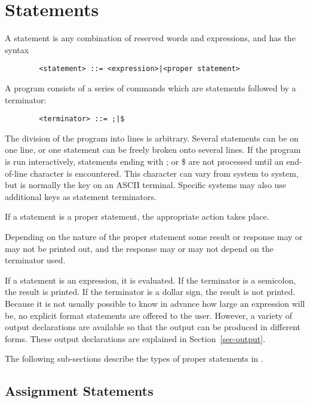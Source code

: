 \chapter{Statements}

A statement is any combination of reserved words and
expressions, and has the syntax 
\begin{verbatim}
        <statement> ::= <expression>|<proper statement>
\end{verbatim}
A {\REDUCE} program consists of a series of commands which are statements
followed by a terminator:
\begin{verbatim}
        <terminator> ::= ;|$
\end{verbatim}
The division of the program into lines is arbitrary. Several statements
can be on one line, or one statement can be freely broken onto several
lines. If the program is run interactively, statements ending with ; or \$
are not processed until an end-of-line character is encountered. This
character can vary from system to system, but is normally the 
key on an ASCII terminal.  Specific systems may also use additional keys
as statement terminators.

If a statement is a proper statement, the
appropriate action takes place.

Depending on the nature of the proper statement some result or response may
or may not be printed out, and the response may or may not depend on the
terminator used.

If a statement is an expression, it is evaluated. If the terminator is a
semicolon, the result is printed. If the terminator is a dollar sign, the
result is not printed. Because it is not usually possible to know in
advance how large an expression will be, no explicit format statements are
offered to the user. However, a variety of output declarations are
available so that the output can be produced in different forms. These
output declarations are explained in Section~\ref{sec-output}.

The following sub-sections describe the types of proper statements
 in {\REDUCE}.

\section{Assignment Statements}

